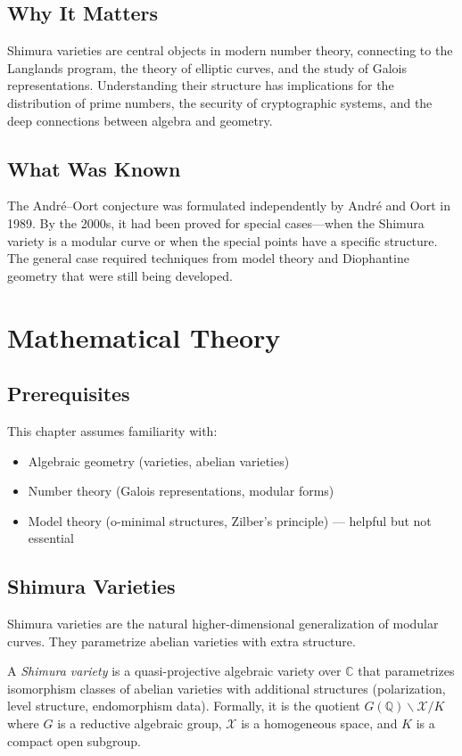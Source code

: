 \subsection{Why It Matters}
Shimura varieties are central objects in modern number theory, connecting to the Langlands program, the theory of elliptic curves, and the study of Galois representations. Understanding their structure has implications for the distribution of prime numbers, the security of cryptographic systems, and the deep connections between algebra and geometry.

\subsection{What Was Known}
The André--Oort conjecture was formulated independently by André and Oort in 1989. By the 2000s, it had been proved for special cases---when the Shimura variety is a modular curve or when the special points have a specific structure. The general case required techniques from model theory and Diophantine geometry that were still being developed.

\section{Mathematical Theory}

\subsection{Prerequisites}
This chapter assumes familiarity with:
\begin{itemize}
\item Algebraic geometry (varieties, abelian varieties)
\item Number theory (Galois representations, modular forms)
\item Model theory (o-minimal structures, Zilber's principle) --- helpful but not essential
\end{itemize}

\subsection{Shimura Varieties}

Shimura varieties are the natural higher-dimensional generalization of modular curves. They parametrize abelian varieties with extra structure.

\begin{definition}
A \emph{Shimura variety} is a quasi-projective algebraic variety over $\mathbb{C}$ that parametrizes isomorphism classes of abelian varieties with additional structures (polarization, level structure, endomorphism data). Formally, it is the quotient $G(\mathbb{Q}) \backslash \mathcal{X} / K$ where $G$ is a reductive algebraic group, $\mathcal{X}$ is a homogeneous space, and $K$ is a compact open subgroup.
\end{definition}

